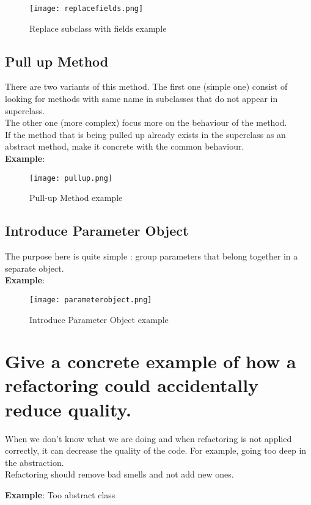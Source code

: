 \begin{figure}[!ht]
\centering
\texttt{[image: replacefields.png]}
\caption{Replace subclass with fields example}
\end{figure}
\FloatBarrier{}

\subsection{Pull up Method}
There are two variants of this method. The first one (simple one) consist of looking for methods with same name in subclasses that do not appear in superclass.\\
The other one (more complex) focus more on the behaviour of the method.\\
If the method that is being pulled up already exists in the superclass as an abstract method, make it
concrete with the common behaviour.
\\
\textbf{Example}:

\begin{figure}[!ht]
\centering
\texttt{[image: pullup.png]}
\caption{Pull-up Method example}
\end{figure}
\FloatBarrier{}

\subsection{Introduce Parameter Object}
The purpose here is quite simple : group parameters that belong together in a separate object.
\\
\textbf{Example}:

\begin{figure}[!ht]
\centering
\texttt{[image: parameterobject.png]}
\caption{Introduce Parameter Object example}
\end{figure}
\FloatBarrier{}


\section{Give a concrete example of how a refactoring could accidentally reduce quality.}

When we don't know what we are doing and when refactoring is not applied correctly, it can decrease the quality of the code. For example, going too deep in the abstraction.\\
Refactoring should remove bad smells and not add new ones.

\textbf{Example}: Too abstract class

